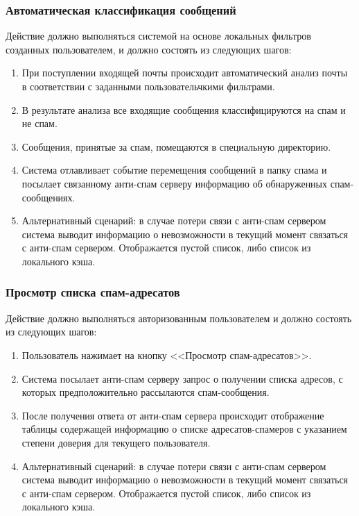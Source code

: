 \subsubsection{Автоматическая классификация сообщений}
Действие должно выполняться системой на основе локальных фильтров созданных пользователем, и должно состоять из следующих шагов:

\begin{enumerate}
  \item При поступлении входящей почты происходит автоматический анализ почты в соответствии с заданными пользовательчкими фильтрами.
  \item В результате анализа все входящие сообщения классифицируются на спам и не спам.
  \item Сообщения, принятые за спам, помещаются в специальную директорию.
  \item Система отлавливает событие перемещения сообщений в папку спама и посылает связанному анти-спам серверу информацию об обнаруженных спам-сообщениях.
  \item Альтернативный сценарий: в случае потери связи с анти-спам сервером система выводит информацию о невозможности в текущий момент связаться с анти-спам сервером. Отображается пустой список, либо список из локального кэша.
\end{enumerate}

\subsubsection{Просмотр списка спам-адресатов}
Действие должно выполняться авторизованным пользователем и должно состоять из следующих шагов:

\begin{enumerate}
  \item Пользователь нажимает на кнопку <<Просмотр спам-адресатов>>.
  \item Система посылает анти-спам серверу запрос о получении списка адресов, с которых предположительно рассылаются спам-сообщения.
  \item После получения ответа от анти-спам сервера происходит отображение таблицы содержащей информацию о списке адресатов-спамеров с указанием степени  доверия для текущего пользователя.
  \item Альтернативный сценарий: в случае потери связи с анти-спам сервером система выводит информацию о невозможности в текущий момент связаться с анти-спам сервером. Отображается пустой список, либо список из локального кэша.
\end{enumerate}



